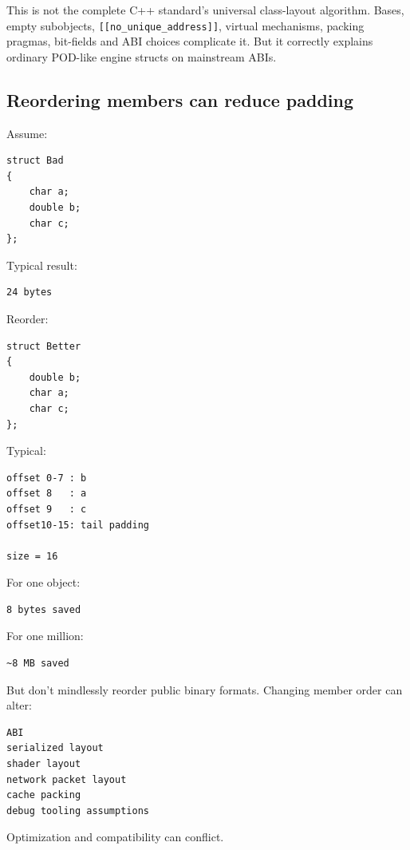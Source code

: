 This is not the complete C++ standard's universal class-layout algorithm. Bases, empty subobjects, \texttt{{[}{[}no\_unique\_address{]}{]}}, virtual mechanisms, packing pragmas, bit-fields and ABI choices complicate it. But it correctly explains ordinary POD-like engine structs on mainstream ABIs.

\subsection{Reordering members can reduce padding}\label{05-engine-i-ch003-reordering-members-can-reduce-padding}

Assume:

\begin{verbatim}
struct Bad
{
    char a;
    double b;
    char c;
};
\end{verbatim}

Typical result:

\begin{verbatim}
24 bytes
\end{verbatim}

Reorder:

\begin{verbatim}
struct Better
{
    double b;
    char a;
    char c;
};
\end{verbatim}

Typical:

\begin{verbatim}
offset 0-7 : b
offset 8   : a
offset 9   : c
offset10-15: tail padding

size = 16
\end{verbatim}

For one object:

\begin{verbatim}
8 bytes saved
\end{verbatim}

For one million:

\begin{verbatim}
~8 MB saved
\end{verbatim}

But don't mindlessly reorder public binary formats. Changing member order can alter:

\begin{verbatim}
ABI
serialized layout
shader layout
network packet layout
cache packing
debug tooling assumptions
\end{verbatim}

Optimization and compatibility can conflict.

